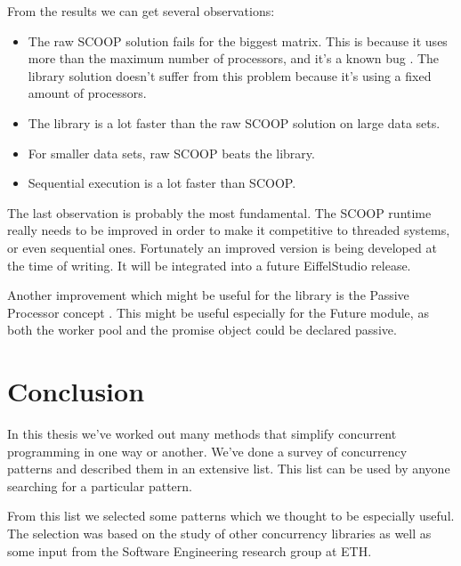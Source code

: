 \documentclass[a4paper,10pt]{article}
\begin{document}

From the results we can get several observations:

\begin{itemize}
 \item The raw SCOOP solution fails for the biggest matrix. 
 This is because it uses more than the maximum number of processors, and it's a known bug \cite{web:scoop-issues}.
 The library solution doesn't suffer from this problem because it's using a fixed amount of processors.
 \item The library is a lot faster than the raw SCOOP solution on large data sets.
 \item For smaller data sets, raw SCOOP beats the library.
 \item Sequential execution is a lot faster than SCOOP.
\end{itemize}

The last observation is probably the most fundamental.
The SCOOP runtime really needs to be improved in order to make it competitive to threaded systems, or even sequential ones.
Fortunately an improved version \cite{thesis:scottwest} is being developed at the time of writing.
It will be integrated into a future EiffelStudio release.

Another improvement which might be useful for the library is the Passive Processor concept \cite{paper:passive-processors}.
This might be useful especially for the Future module, as both the worker pool and the promise object could be declared passive.

\section{Conclusion}

In this thesis we've worked out many methods that simplify concurrent programming in one way or another.
We've done a survey of concurrency patterns and described them in an extensive list.
This list can be used by anyone searching for a particular pattern.

From this list we selected some patterns which we thought to be especially useful.
The selection was based on the study of other concurrency libraries as well as some input from the Software Engineering research group at ETH.
\end{document}

